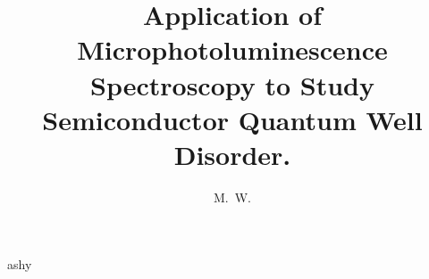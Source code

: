 \documentclass[11pt,modernstyle]{thesis} %
\title{Application of Microphotoluminescence Spectroscopy to Study Semiconductor Quantum Well Disorder.}
\author{M.~W.}{Day}
\begin{document}
ashy
\end{document}
